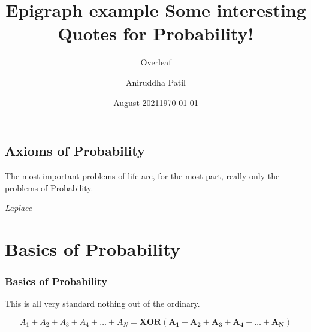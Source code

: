 \documentclass[11pt]{book}
\title{Epigraph example}
\author{Overleaf}
\date{August 2021}
\title{ \textbf{Some interesting Quotes for Probability!}}
\author{ Aniruddha Patil }
\date{\today}
\begin{document}
\frontmatter
\mainmatter
\maketitle










\chapter{Axioms of Probability}
\epigraph{The most important problems of life are, for the most part, really only the problems of Probability.}{\textit{Laplace}}

\part*{Basics of Probability}
\section{Basics of Probability}
 {This is all very standard nothing out of the ordinary.}

$$A_1 + A_2 + A_3 + A_4 + \ldots + A_N = \mathbf{XOR(A_1+A_2+A_3+A_4+\ldots+A_N)}$$



\end{document}
